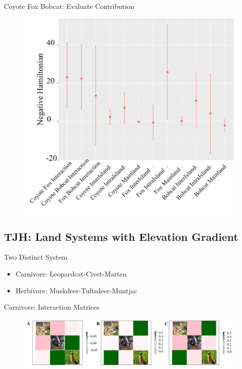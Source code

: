 \documentclass{beamer}
\begin{document}
\begin{frame}{Coyote Fox Bobcat: Evaluate Contribution}
\begin{figure}[ht]
			\centering
			\includegraphics[scale=.3]{fig/APIS/CFB/CFB_Hamiltonian.jpg}
			\label{CFB_H	}
		\end{figure}
\end{frame}

\subsection{TJH: Land Systems with Elevation Gradient}
\begin{frame}{Two Distinct System}
	\begin{itemize}
		\item Carnivore: Leopardcat-Civet-Marten
		\item Herbivore: Muskdeer-Tuftsdeer-Muntjac 
	\end{itemize}
\end{frame}

\begin{frame}{Carnivore: Interaction Matrices}
	\begin{figure}[ht]
		\centering
		\includegraphics[scale=.23]{fig/TJH/car/TJH_carn.jpg}
		\label{carn}
	\end{figure}
\end{frame}
\end{document}
